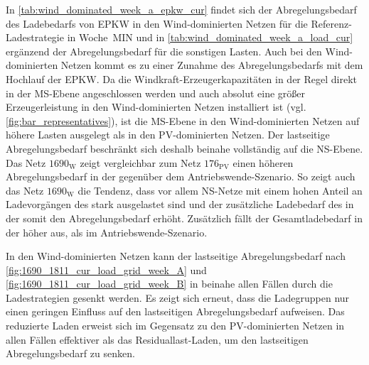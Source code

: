 In \autoref{tab:wind_dominated_week_a_epkw_cur} findet sich der Abregelungsbedarf des Ladebedarfs von \gls{EPKW} in den Wind-dominierten Netzen für die Referenz-Ladestrategie in Woche~MIN und in \autoref{tab:wind_dominated_week_a_load_cur} ergänzend der Abregelungsbedarf für die sonstigen Lasten.
Auch bei den Wind-dominierten Netzen kommt es zu einer Zunahme des Abregelungsbedarfs mit dem Hochlauf der \gls{EPKW}.
Da die Windkraft-Erzeugerkapazitäten in der Regel direkt in der \gls{MS}-Ebene angeschlossen werden und auch absolut eine größer Erzeugerleistung in den Wind-dominierten Netzen installiert ist (vgl. \autoref{fig:bar_representatives}), ist die \gls{MS}-Ebene in den Wind-dominierten Netzen auf höhere Lasten ausgelegt als in den \gls{PV}-dominierten Netzen.
Der lastseitige Abregelungsbedarf beschränkt sich deshalb beinahe vollständig auf die \gls{NS}-Ebene.
Das Netz \(1690_{\text{W}}\) zeigt vergleichbar zum Netz \(176_{\text{PV}}\) einen höheren Abregelungsbedarf in der \SzeFirmenparkplatz gegenüber dem Antriebswende-Szenario.
So zeigt auch das Netz \(1690_{\text{W}}\) die Tendenz, dass vor allem \gls{NS}-Netze mit einem hohen Anteil an Ladevorgängen des \UC \zH stark ausgelastet sind und der zusätzliche Ladebedarf des \UC \zH in der \SzeFirmenparkplatz somit den Abregelungsbedarf erhöht.
Zusätzlich fällt der Gesamtladebedarf in der \SzeFirmenparkplatz höher aus, als im Antriebswende-Szenario.





In den Wind-dominierten Netzen kann der lastseitige Abregelungsbedarf nach \autoref{fig:1690_1811_cur_load_grid_week_A} und \autoref{fig:1690_1811_cur_load_grid_week_B} in beinahe allen Fällen durch die Ladestrategien gesenkt werden.
Es zeigt sich erneut, dass die Ladegruppen nur einen geringen Einfluss auf den lastseitigen Abregelungsbedarf aufweisen.
Das reduzierte Laden erweist sich im Gegensatz zu den \gls{PV}-dominierten Netzen in allen Fällen effektiver als das Residuallast-Laden, um den lastseitigen Abregelungsbedarf zu senken.\medskip




